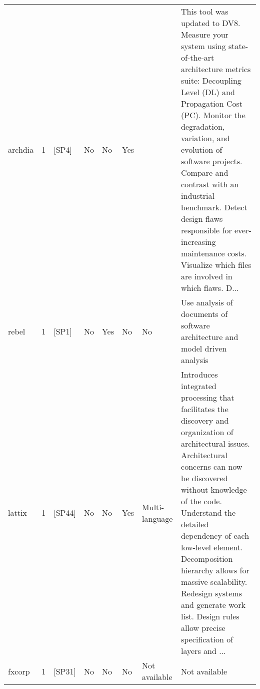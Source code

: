 \begin{tabular}{lrllllll}
             archdia &      1 &                                                  [SP4] &    No &       No &       Yes &                                                                                                                                                                                         &  This tool was updated to DV8. Measure your system using state-of-the-art architecture metrics suite: Decoupling Level (DL) and Propagation Cost (PC). Monitor the degradation, variation, and evolution of software projects. Compare and contrast with an industrial benchmark. Detect design flaws responsible for ever-increasing maintenance costs. Visualize which files are involved in which flaws. D... \\
               rebel &      1 &                                                  [SP1] &    No &      Yes &        No &                                                                                                                                                                                      No &                                                                                                                                                                                                                                                                                                                                     Use analysis of documents of software architecture and model driven analysis \\
              lattix &      1 &                                                 [SP44] &    No &       No &       Yes &                                                                                                                                                                          Multi-language &  Introduces integrated processing that facilitates the discovery and organization of architectural issues. Architectural concerns can now be discovered without knowledge of the code. Understand the detailed dependency of each low-level element. Decomposition hierarchy allows for massive scalability. Redesign systems and generate work list. Design rules allow precise specification of layers and ... \\
              fxcorp &      1 &                                                 [SP31] &    No &       No &        No &                                                                                                                                                                           Not available &                                                                                                                                                                                                                                                                                                                                                                                                    Not available \\

\end{tabular}
